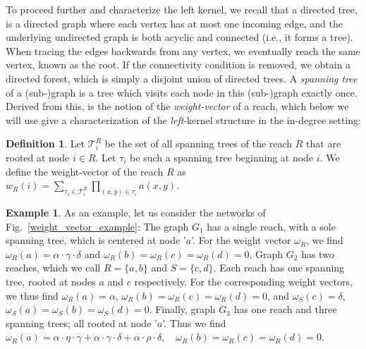 \documentclass[reqno,12pt,letterpaper]{amsart}
\numberwithin{equation}{section}
\newcommand{\1}{\mathds{1}}
\theoremstyle{definition}
\newtheorem{Def}[Th]{Definition}
\newtheorem{Ex}[Th]{Example}
\begin{document}
	
	
	
	
	To proceed further and characterize the left kernel, we recall that a directed tree, is a directed graph where each vertex has at most one incoming edge, and the underlying undirected graph is both acyclic and connected (i.e., it forms a tree). When tracing the edges backwards from any vertex, we eventually reach the same vertex, known as the root. If the connectivity condition is removed, we obtain a directed forest, which is simply a disjoint union of directed trees. A \emph{spanning tree} of a (sub-)graph is a tree which visits each node in this (sub-)graph exactly once. Derived from this, is the notion of the \emph{weight-vector} of  a reach, which below we will use give a characterization of the \emph{left}-kernel structure in the in-degree setting:
	

	
	
	
	
	
	\begin{Def}\label{weight_vector} Let $\mathcal{T}^R_i$ be the set of all spanning trees of the reach $R$ that are rooted at node $i\in R$. Let  $\tau_i$ be such a spanning tree beginning at node $i$. We define the weight-vector of the reach $R$ as 
		$
		w_R(i) = \sum\limits_{\tau_i \in \mathcal{T}^R_i} \prod\limits_{(x,y)\in\tau_i} a(x,y).
		$
	\end{Def}	



\begin{Ex}\label{weight_vector_example_writing}
As an example, let us consider the networks of Fig.~\ref{weight_vector_example}:
The graph $G_1$ has a single reach, with a sole spanning tree, which is centered at node '$a$'.  
For the weight vector $\omega_R$, we find $\omega_R(a) = \alpha \cdot \gamma \cdot \delta$ and 
$\omega_R(b) = \omega_R(c) = \omega_R(d) = 0$. 
Graph $G_2$ has two reaches, which we call $R = \{a,b\}$ and $S = \{c,d\}$. 
Each reach has one spanning tree, rooted at nodes $a$ and $c$ respectively. 
For the corresponding weight vectors, we thus find 
$\omega_R(a) = \alpha$, 
$\omega_R(b) = \omega_R(c) = \omega_R(d) = 0$, and 
$\omega_S(c) = \delta$, 
$\omega_S(a) = \omega_S(b) = \omega_S(d) = 0$.
Finally, graph $G_3$ has one reach and three spanning trees; all rooted at node '$a$'. 
Thus we find
$
\omega_R(a) = \alpha \cdot \eta \cdot \gamma  
+ \alpha \cdot \gamma \cdot \delta    
+ \alpha \cdot \rho \cdot \delta, \quad 
\omega_R(b) = \omega_R(c) = \omega_R(d) = 0.
$
\end{Ex}
\end{document}
